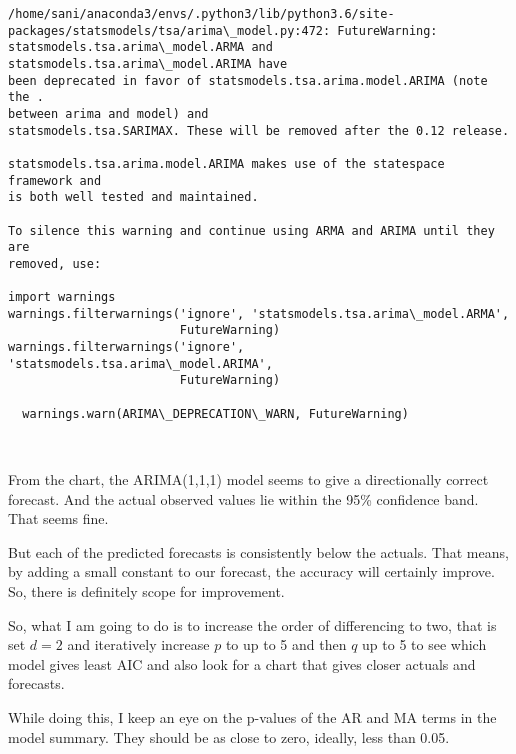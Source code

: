 \documentclass[11pt]{article}
\begin{document}
    \begin{Verbatim}[commandchars=\\\{\}]
/home/sani/anaconda3/envs/.python3/lib/python3.6/site-
packages/statsmodels/tsa/arima\_model.py:472: FutureWarning:
statsmodels.tsa.arima\_model.ARMA and statsmodels.tsa.arima\_model.ARIMA have
been deprecated in favor of statsmodels.tsa.arima.model.ARIMA (note the .
between arima and model) and
statsmodels.tsa.SARIMAX. These will be removed after the 0.12 release.

statsmodels.tsa.arima.model.ARIMA makes use of the statespace framework and
is both well tested and maintained.

To silence this warning and continue using ARMA and ARIMA until they are
removed, use:

import warnings
warnings.filterwarnings('ignore', 'statsmodels.tsa.arima\_model.ARMA',
                        FutureWarning)
warnings.filterwarnings('ignore', 'statsmodels.tsa.arima\_model.ARIMA',
                        FutureWarning)

  warnings.warn(ARIMA\_DEPRECATION\_WARN, FutureWarning)
    \end{Verbatim}

    \begin{center}
    \end{center}
    { \hspace*{\fill} \\}
    
    From the chart, the ARIMA(1,1,1) model seems to give a directionally
correct forecast. And the actual observed values lie within the 95\%
confidence band. That seems fine.

But each of the predicted forecasts is consistently below the actuals.
That means, by adding a small constant to our forecast, the accuracy
will certainly improve. So, there is definitely scope for improvement.

So, what I am going to do is to increase the order of differencing to
two, that is set \(d=2\) and iteratively increase \(p\) to up to 5 and
then \(q\) up to 5 to see which model gives least AIC and also look for
a chart that gives closer actuals and forecasts.

While doing this, I keep an eye on the p-values of the AR and MA terms
in the model summary. They should be as close to zero, ideally, less
than 0.05.
\end{document}
